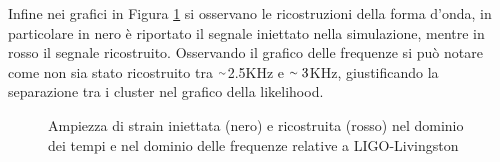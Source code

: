 Infine nei grafici in Figura \ref{fig:strain_apr4} si osservano le ricostruzioni della forma d'onda, in particolare in nero è riportato il segnale iniettato nella simulazione, mentre in rosso il segnale ricostruito. Osservando il grafico delle frequenze si può notare come non sia stato ricostruito tra $\smallsim$2.5KHz e $\smallsim3$KHz, giustificando la separazione tra i cluster nel grafico della likelihood.
\begin{figure}[!]
	\centering
	\caption{Ampiezza di strain iniettata (nero) e ricostruita (rosso) nel dominio dei tempi e nel dominio delle frequenze relative a LIGO-Livingston}
	\label{fig:strain_apr4}
\end{figure}

